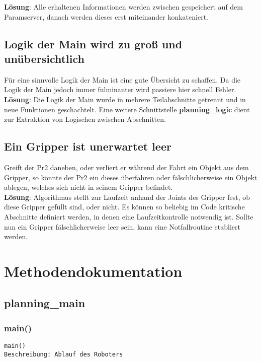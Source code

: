 \documentclass{suturo}
\begin{document}
\textbf{Lösung}: Alle erhaltenen Informationen werden zwischen gespeichert auf dem Paramserver, danach werden dieses erst miteinander konkateniert.

\subsection*{Logik der Main wird zu groß und unübersichtlich}
Für eine sinnvolle Logik der Main ist eine gute Übersicht zu schaffen. Da die Logik der Main jedoch immer fulminanter wird passiere hier schnell Fehler.\\

\textbf{Lösung}: Die Logik der Main wurde in mehrere Teilabschnitte getrennt und in neue Funktionen geschachtelt. Eine weitere Schnittstelle \textbf{planning\_logic} dient zur Extraktion von Logischen zwischen Abschnitten.\\

\subsection*{Ein Gripper ist unerwartet leer}
Greift der Pr2 daneben, oder verliert er während der Fahrt ein Objekt aus dem Gripper, so könnte der Pr2 ein dieses überfahren oder fälschlicherweise ein Objekt ablegen, welches sich nicht in seinem Gripper befindet.\\

\textbf{Lösung}: Algorithmus stellt zur Laufzeit anhand der Joints des Gripper fest, ob diese Gripper gefüllt sind, oder nicht. Es können so beliebig im Code kritische Abschnitte definiert werden, in denen eine Laufzeitkontrolle notwendig ist. Sollte nun ein Gripper fälschlicherweise leer sein, kann eine Notfallroutine etabliert werden.
      
\section*{Methodendokumentation}

\subsection{planning\_main}

\subsubsection{main()}
\begin{verbatim}
main()
Beschreibung: Ablauf des Roboters
\end{verbatim}
\end{document}
